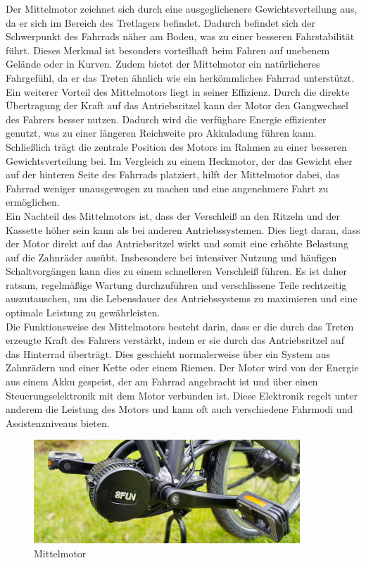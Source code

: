 Der Mittelmotor zeichnet sich durch eine ausgeglichenere Gewichtsverteilung aus, da er sich im Bereich des Tretlagers befindet. Dadurch befindet sich der Schwerpunkt des Fahrrads näher am Boden, was zu einer besseren Fahrstabilität führt. Dieses Merkmal ist besonders vorteilhaft beim Fahren auf unebenem Gelände oder in Kurven. Zudem bietet der Mittelmotor ein natürlicheres Fahrgefühl, da er das Treten ähnlich wie ein herkömmliches Fahrrad unterstützt.\\

Ein weiterer Vorteil des Mittelmotors liegt in seiner Effizienz. Durch die direkte Übertragung der Kraft auf das Antriebsritzel kann der Motor den Gangwechsel des Fahrers besser nutzen. Dadurch wird die verfügbare Energie effizienter genutzt, was zu einer längeren Reichweite pro Akkuladung führen kann. Schließlich trägt die zentrale Position des Motors im Rahmen zu einer besseren Gewichtsverteilung bei. Im Vergleich zu einem Heckmotor, der das Gewicht eher auf der hinteren Seite des Fahrrads platziert, hilft der Mittelmotor dabei, das Fahrrad weniger unausgewogen zu machen und eine angenehmere Fahrt zu ermöglichen.\\

Ein Nachteil des Mittelmotors ist, dass der Verschleiß an den Ritzeln und der Kassette höher sein kann als bei anderen Antriebssystemen. Dies liegt daran, dass der Motor direkt auf das Antriebsritzel wirkt und somit eine erhöhte Belastung auf die Zahnräder ausübt. Insbesondere bei intensiver Nutzung und häufigen Schaltvorgängen kann dies zu einem schnelleren Verschleiß führen. Es ist daher ratsam, regelmäßige Wartung durchzuführen und verschlissene Teile rechtzeitig auszutauschen, um die Lebensdauer des Antriebssystems zu maximieren und eine optimale Leistung zu gewährleisten.\\

Die Funktionsweise des Mittelmotors besteht darin, dass er die durch das Treten erzeugte Kraft des Fahrers verstärkt, indem er sie durch das Antriebsritzel auf das Hinterrad überträgt. Dies geschieht normalerweise über ein System aus Zahnrädern und einer Kette oder einem Riemen. Der Motor wird von der Energie aus einem Akku gespeist, der am Fahrrad angebracht ist und über einen Steuerungselektronik mit dem Motor verbunden ist. Diese Elektronik regelt unter anderem die Leistung des Motors und kann oft auch verschiedene Fahrmodi und Assistenzniveaus bieten.

\begin{figure}[h]
    \centering
    \includegraphics[width=10cm]{images/Mittelmotor-Fahrrad-nachruesten_F01.jpg}
    \caption{Mittelmotor\cite{noauthor_mittelmotor_nodate}}%
    \label{fig:8}
\end{figure}

